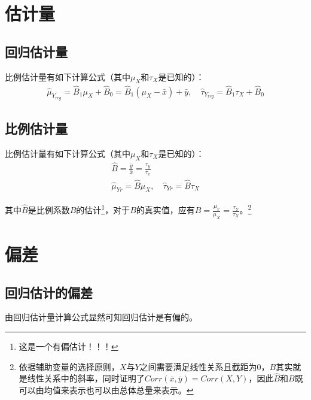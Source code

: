 \section{估计量}

\subsection{回归估计量}
\begin{definition}
	比例估计量有如下计算公式（其中$\mu_X$和$\tau_X$是已知的）：
	\begin{gather*}
		\hat{\mu}_{Y_{reg}}=\hat{B}_1\mu_X+\hat{B}_0=\hat{B}_1(\mu_X-\bar{x})+\bar{y},\quad
		\hat{\tau}_{Y_{reg}}=\hat{B}_1\tau_X+\hat{B}_0
	\end{gather*}
\end{definition}


\subsection{比例估计量}
\begin{definition}
	比例估计量有如下计算公式（其中$\mu_X$和$\tau_X$是已知的）：
	\begin{gather*}
		\hat{B}=\frac{\bar{y}}{\bar{x}}=\frac{\tau_y}{\tau_x} \\
		\hat{\mu}_{Yr}=\hat{B}\mu_X,\quad\hat{\tau}_{Yr}=\hat{B}\tau_X 
	\end{gather*}
\end{definition}
其中$\hat{B}$是比例系数$B$的估计\footnote{这是一个有偏估计！！！}，对于$B$的真实值，应有$B=\frac{\mu_Y}{\mu_X}=\frac{\tau_Y}{\tau_X}$。\footnote{依据辅助变量的选择原则，$X$与$Y$之间需要满足线性关系且截距为$0$，$B$其实就是线性关系中的斜率，同时证明了$Corr(\bar{x},\bar{y})=Corr(X,Y)$，因此$\hat{B}$和$B$既可以由均值来表示也可以由总体总量来表示。}
\section{偏差}
\subsection{回归估计的偏差}
由回归估计量计算公式显然可知回归估计是有偏的。
